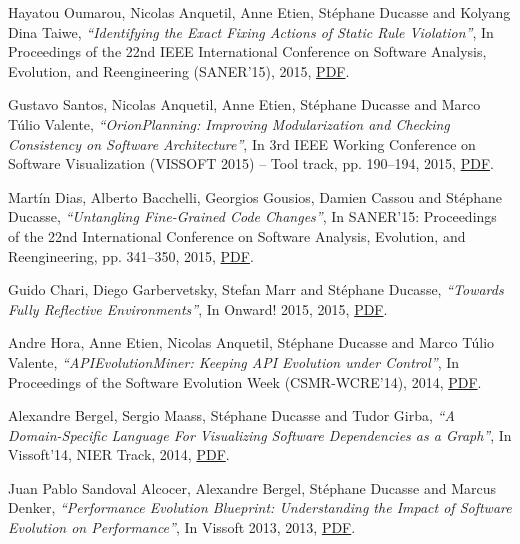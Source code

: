\documentclass{article}
\newcommand{\czauthors}[1]{#1}
\newcommand{\cztitle}[1]{\emph{``#1''}}
\newcommand{\czbooktitle}[1]{#1}
\begin{document}
\begin{itemize}
	\pub  \czauthors{Hayatou Oumarou, Nicolas Anquetil, Anne Etien, St\'ephane Ducasse and Kolyang Dina Taiwe},  \cztitle{Identifying the Exact Fixing Actions of Static Rule Violation},  In \czbooktitle{Proceedings of the 22nd IEEE International Conference on Software Analysis, Evolution, and Reengineering (SANER'15)}, 2015, \href{http://rmod-files.lille.inria.fr/Team/Texts/Papers/Haya15a-Saner-FixingActionOfStaticRule.pdf}{PDF}.

	\pub  \czauthors{Gustavo Santos, Nicolas Anquetil, Anne Etien, St\'ephane Ducasse and Marco T\'ulio Valente},  \cztitle{OrionPlanning: Improving Modularization and Checking Consistency on Software Architecture},  In \czbooktitle{3rd IEEE Working Conference on Software Visualization (VISSOFT 2015) -- Tool track}, pp. 190--194, 2015, \href{http://rmod-files.lille.inria.fr/Team/Texts/Papers/Sant15c-VISSOFT-OrionPlanning.pdf}{PDF}.

	\pub  \czauthors{Mart\'in Dias, Alberto Bacchelli, Georgios Gousios, Damien Cassou and St\'ephane Ducasse},  \cztitle{Untangling Fine-Grained Code Changes},  In \czbooktitle{SANER'15: Proceedings of the 22nd International Conference on Software Analysis, Evolution, and Reengineering}, pp. 341--350, 2015, \href{http://rmod-files.lille.inria.fr/Team/Texts/Papers/Dias15a-Saner-FineGrainedChanges.pdf}{PDF}.

	\pub  \czauthors{Guido Chari, Diego Garbervetsky, Stefan Marr and St\'ephane Ducasse},  \cztitle{Towards Fully Reflective Environments},  In \czbooktitle{Onward! 2015}, 2015, \href{http://rmod-files.lille.inria.fr/Team/Texts/Papers/Char15a-Onward-ReflectiveVM.pdf}{PDF}.

	\pub  \czauthors{Andre Hora, Anne Etien, Nicolas Anquetil, St\'ephane Ducasse and Marco T\'ulio Valente},  \cztitle{APIEvolutionMiner: Keeping API Evolution under Control},  In \czbooktitle{Proceedings of the Software Evolution Week (CSMR-WCRE'14)}, 2014, \href{http://rmod-files.lille.inria.fr/Team/Texts/Papers/Hora14a-CSMR-WCRE-APIEvolutionMiner.pdf}{PDF}.

	\pub  \czauthors{Alexandre Bergel, Sergio Maass, St\'ephane Ducasse and Tudor Girba},  \cztitle{A Domain-Specific Language For Visualizing Software Dependencies as a Graph},  In \czbooktitle{Vissoft'14, NIER Track}, 2014, \href{http://rmod-files.lille.inria.fr/Team/Texts/Papers/Berg14a-Vissoft-DomainSpecific.pdf}{PDF}.

	\pub  \czauthors{Juan Pablo Sandoval Alcocer, Alexandre Bergel, St\'ephane Ducasse and Marcus Denker},  \cztitle{Performance Evolution Blueprint: Understanding the Impact of Software Evolution on Performance},  In \czbooktitle{Vissoft 2013}, 2013, \href{http://rmod-files.lille.inria.fr/Team/Texts/Papers/Sand13a-Vissoft-PreformanceBlueprint.pdf}{PDF}.


\end{itemize}
\end{document}
